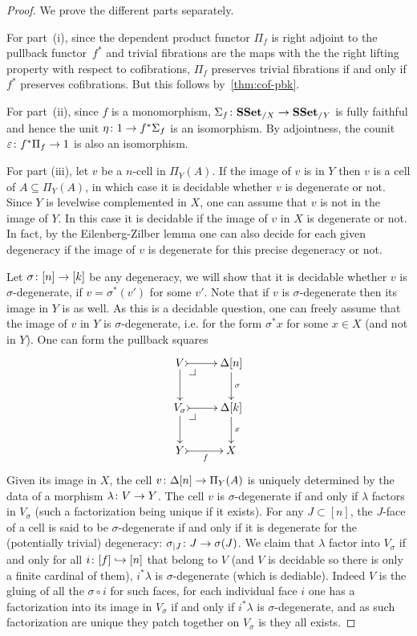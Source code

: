 \documentclass[reqno,10pt,a4paper,oneside,draft]{amsart}
\begin{document}
 
\begin{proof} We prove the different parts separately. 

For part~(i), since the dependent product functor $\Pi_f$ is right adjoint to the pullback functor~$f^*$ and trivial fibrations are the maps with the the right lifting property with respect to cofibrations, $\Pi_f$ preserves trivial fibrations if and only if $f^*$ preserves cofibrations. But this follows by~\cref{thm:cof-pbk}.

For part~(ii),  since $f$ is a monomorphism,  $\Sigma_f \colon \mathbf{SSet}_{/X} \rightarrow \mathbf{SSet}_{/Y}$ is fully faithful and hence the unit $\eta \colon 1 \rightarrow f^*  \Sigma_{f}$ is an isomorphism. By adjointness, the counit $\varepsilon \colon f^* \Pi_f \rightarrow 1$ is also an isomorphism. 

 For part (iii),   let $v$ be a $n$-cell in $\Pi_Y(A)$.
If the image of $v$ is in $Y$ then $v$ is a cell of $A \subseteq \Pi_Y(A)$, in which case it is decidable whether $v$ is degenerate or not.
Since $Y$ is levelwise complemented in $X$, one can assume that $v$ is not in the image of $Y$. In this case it is decidable if the image of $v$ in $X$ is degenerate or not.
In fact, by the Eilenberg-Zilber lemma one can also decide for each given degeneracy if the image of $v$ is degenerate for this precise degeneracy or not. 

Let $\sigma \colon [n] \to [k]$ be any degeneracy, we will show that it is decidable whether $v$ is $\sigma$-degenerate, \ie if $v =\sigma^*(v')$ for some $v'$. Note that if $v$ is $\sigma$-degenerate then its image in $Y$ is as well. As this is a decidable question, one can freely assume that the image of $v$ in $Y$ is $\sigma$-degenerate, i.e. for the form $\sigma^* x$ for some $x \in X$ (and not in $Y$). One can form the pullback squares
\[
\xymatrix{
V \ar@{>->}[r] \drpullback \ar[d] & \Delta[n] \ar@{->}[d]^{\sigma} \\
V_{\sigma} \ar@{>->}[r] \drpullback \ar[d] & \Delta[k] \ar@{->}[d]^x \\
Y \ar@{>->}[r]_{f} &  X }
\]
Given its image in $X$, the cell $v \colon \Delta[n] \rightarrow \Pi_Y(A)$ is uniquely determined by the data of a morphism $\lambda \colon V\rightarrow Y$. The cell $v$ is $\sigma$-degenerate if and only if $\lambda$ factors in $V_{\sigma}$ (such a factorization being unique if it exists). For any $J \subset [n]$, the $J$-face of a cell is said to be $\sigma$-degenerate if and only if it is degenerate for the (potentially trivial) degeneracy: 
$\sigma_{|J} \colon J \rightarrow \sigma(J)$. We claim that $\lambda$ factor into $V_{\sigma}$ if and only for all $i \colon [f] \hookrightarrow [n]$ that belong to $V$ (and $V$ is decidable so there is only a finite cardinal of them), $i^* \lambda$ is $\sigma$-degenerate (which is dediable). Indeed $V$ is the gluing of all the $\sigma \circ i$ for such faces, for each individual face $i$ one has a factorization into its image in $V_{\sigma}$ if and only if $i^* \lambda$ is $\sigma$-degenerate, and as such factorization are unique they patch together on $V_{\sigma}$ is they all exists.


\end{proof}
\end{document}
